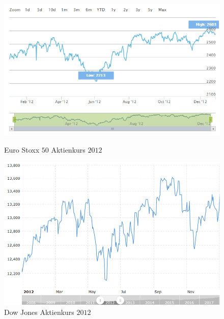  \begin{figure}[H]
 \begin{minipage}[b]{.4\linewidth} %
 	\includegraphics[width=1\textwidth]{EuroxStoxx.png}
 	\caption{Euro Stoxx $50$ Aktienkurs $2012$} \label{eustoxx}
 \end{minipage}
 \hspace{.1\linewidth}%
 \begin{minipage}[b]{.4\linewidth} %
 	\includegraphics[width=1\textwidth]{DowJones2012.png}
 	\caption{Dow Jones Aktienkurs $2012$}\label{dowjones}
 \end{minipage}
\end{figure}
